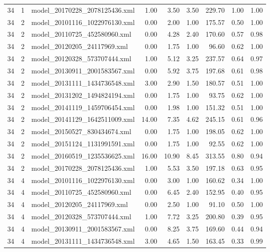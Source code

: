 \begin{table}[ht]
\begin{tabular}{rrlrrrrrr}
   34 &   1 & model\_20170228\_2078125436.xml & 1.00 & 3.50 & 3.50 & 229.70 & 1.00 & 1.00 \\ 
   34 &   2 & model\_20101116\_1022976130.xml & 0.00 & 2.00 & 1.00 & 175.57 & 0.50 & 1.00 \\ 
   34 &   2 & model\_20110725\_452580960.xml & 0.00 & 4.28 & 2.40 & 170.60 & 0.57 & 0.98 \\ 
   34 &   2 & model\_20120205\_24117969.xml & 0.00 & 1.75 & 1.00 & 96.60 & 0.62 & 1.00 \\ 
   34 &   2 & model\_20120328\_573707444.xml & 1.00 & 5.12 & 3.25 & 237.57 & 0.64 & 0.97 \\ 
   34 &   2 & model\_20130911\_2001583567.xml & 0.00 & 5.92 & 3.75 & 197.68 & 0.61 & 0.98 \\ 
   34 &   2 & model\_20131111\_1434736548.xml & 3.00 & 2.90 & 1.50 & 180.57 & 0.51 & 1.00 \\ 
   34 &   2 & model\_20131202\_1494824194.xml & 0.00 & 1.75 & 1.00 & 93.75 & 0.62 & 1.00 \\ 
   34 &   2 & model\_20141119\_1459706454.xml & 0.00 & 1.98 & 1.00 & 151.32 & 0.51 & 1.00 \\ 
   34 &   2 & model\_20141129\_1642511009.xml & 14.00 & 7.35 & 4.62 & 245.15 & 0.61 & 0.96 \\ 
   34 &   2 & model\_20150527\_830434674.xml & 0.00 & 1.75 & 1.00 & 198.05 & 0.62 & 1.00 \\ 
   34 &   2 & model\_20151124\_1131991591.xml & 0.00 & 1.75 & 1.00 & 92.55 & 0.62 & 1.00 \\ 
   34 &   2 & model\_20160519\_1235536625.xml & 16.00 & 10.90 & 8.45 & 313.55 & 0.80 & 0.94 \\ 
   34 &   2 & model\_20170228\_2078125436.xml & 1.00 & 5.53 & 3.50 & 197.18 & 0.63 & 0.95 \\ 
   34 &   4 & model\_20101116\_1022976130.xml & 0.00 & 3.00 & 1.00 & 160.62 & 0.34 & 1.00 \\ 
   34 &   4 & model\_20110725\_452580960.xml & 0.00 & 6.45 & 2.40 & 152.95 & 0.40 & 0.95 \\ 
   34 &   4 & model\_20120205\_24117969.xml & 0.00 & 2.50 & 1.00 & 91.10 & 0.50 & 1.00 \\ 
   34 &   4 & model\_20120328\_573707444.xml & 1.00 & 7.72 & 3.25 & 200.80 & 0.39 & 0.95 \\ 
   34 &   4 & model\_20130911\_2001583567.xml & 0.00 & 8.25 & 3.75 & 169.60 & 0.44 & 0.94 \\ 
   34 &   4 & model\_20131111\_1434736548.xml & 3.00 & 4.65 & 1.50 & 163.45 & 0.33 & 0.99 \\ 

\end{tabular}
\end{table}

